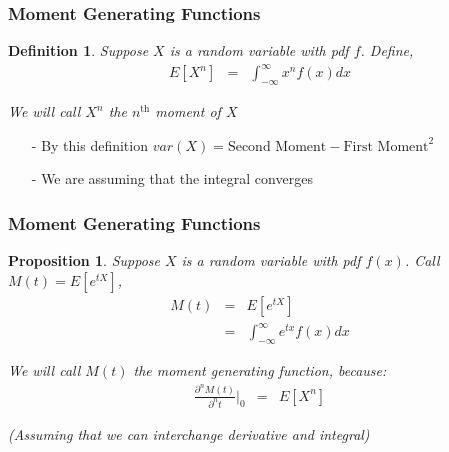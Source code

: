 \documentclass{beamer}
\newtheorem{prop}{Proposition}
\newtheorem{defn}{Definition}
\numberwithin{equation}{section}
\begin{document}
\begin{frame}
\frametitle{Moment Generating Functions}


\begin{defn}
Suppose $X$ is a random variable with pdf $f$.  Define, 
\begin{eqnarray}
E[X^{n}] & = & \int_{-\infty}^{\infty} x^{n} f(x) dx   \nonumber 
\end{eqnarray}

We will call $X^{n}$ the \alert{$n^{\text{th}}$} moment of $X$ 

\end{defn}

\begin{itemize}
\item[-] By this definition $var(X) = \text{Second Moment} - \text{First Moment}^{2} $
\item[-] We are assuming that the integral converges
\end{itemize}

\end{frame}


\begin{frame}
\frametitle{Moment Generating Functions}

\begin{prop}
Suppose $X$ is a random variable with pdf $f(x)$.  Call $M(t) = E[e^{tX}]$, 
\begin{eqnarray}
M(t) & = & E[e^{tX}] \nonumber \\
 & = & \int_{-\infty}^{\infty} e^{tx} f(x) dx \nonumber 
 \end{eqnarray}

We will call $M(t)$ the moment generating function, because:
\begin{eqnarray}
\frac{\partial^{n} M (t) }{\partial^{n} t}|_{0} & = & E[X^{n}] \nonumber 
\end{eqnarray}

(Assuming that we can interchange derivative and integral)

\end{prop}



\end{frame}




\begin{frame}


\end{frame}
\end{document}
